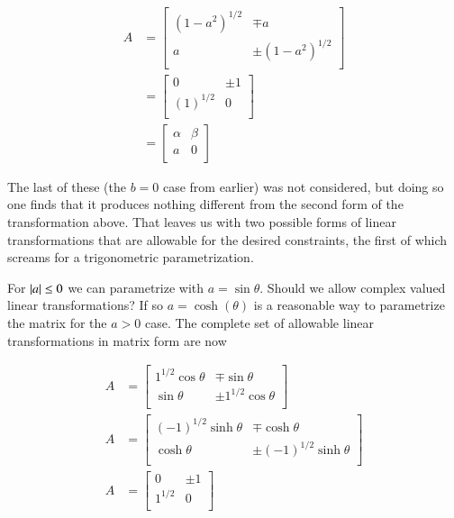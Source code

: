 \begin{align}\label{eqn:quadratricForm:voo17}
A 
&= 
\begin{bmatrix}
(1 - a^2)^{1/2} & \mp a \\
a  & \pm (1 - a^2)^{1/2} \\
\end{bmatrix} \\
&= 
\begin{bmatrix}
0 & \pm 1 \\
(1)^{1/2} & 0 \\
\end{bmatrix} \\
&=
\begin{bmatrix}
\alpha & \beta \\
a & 0 \\
\end{bmatrix} 
\end{align}

The last of these (the $b=0$ case from earlier) was not considered, but doing so one finds that it produces nothing different from the second form of the transformation above.  That leaves us with two possible forms of linear transformations that are allowable for the desired constraints, the first of which screams for a trigonometric parametrization.

For $\left\lvert{a}\right\rvert \le 0$ we can parametrize with $a = \sin\theta$.  Should we allow complex valued linear transformations?  If so $a = \cosh(\theta)$ is a reasonable way to parametrize the matrix for the $a > 0$ case.  The complete set of allowable linear transformations in matrix form are now

\begin{align}\label{eqn:quadratricForm:voo18}
A &= 
\begin{bmatrix}
1^{1/2} \cos\theta & \mp \sin\theta \\
\sin\theta & \pm 1^{1/2} \cos\theta \\
\end{bmatrix} \\
A &= 
\begin{bmatrix}
(-1)^{1/2} \sinh\theta & \mp \cosh\theta \\
\cosh\theta  & \pm (-1)^{1/2} \sinh\theta \\
\end{bmatrix} \\
A &= 
\begin{bmatrix}
0 & \pm 1 \\
1^{1/2} & 0 \\
\end{bmatrix}
\end{align}

